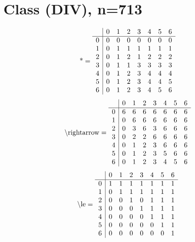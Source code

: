 \documentclass[11pt]{article}
\begin{document}
\section{Class (DIV), n=713}
\[\text{*} = 
\begin{array}{r | r r r r r r r}
 & 0 & 1 & 2 & 3 & 4 & 5 & 6 \\ \hline
0 & 0 & 0 & 0 & 0 & 0 & 0 & 0 \\
1 & 0 & 1 & 1 & 1 & 1 & 1 & 1 \\
2 & 0 & 1 & 2 & 1 & 2 & 2 & 2 \\
3 & 0 & 1 & 1 & 3 & 3 & 3 & 3 \\
4 & 0 & 1 & 2 & 3 & 4 & 4 & 4 \\
5 & 0 & 1 & 2 & 3 & 4 & 4 & 5 \\
6 & 0 & 1 & 2 & 3 & 4 & 5 & 6 \\
\end{array}
\]
\[\text{\textbackslash rightarrow} = 
\begin{array}{r | r r r r r r r}
 & 0 & 1 & 2 & 3 & 4 & 5 & 6 \\ \hline
0 & 6 & 6 & 6 & 6 & 6 & 6 & 6 \\
1 & 0 & 6 & 6 & 6 & 6 & 6 & 6 \\
2 & 0 & 3 & 6 & 3 & 6 & 6 & 6 \\
3 & 0 & 2 & 2 & 6 & 6 & 6 & 6 \\
4 & 0 & 1 & 2 & 3 & 6 & 6 & 6 \\
5 & 0 & 1 & 2 & 3 & 5 & 6 & 6 \\
6 & 0 & 1 & 2 & 3 & 4 & 5 & 6 \\
\end{array}
\]
\[\text{\textbackslash le} = 
\begin{array}{r | r r r r r r r}
 & 0 & 1 & 2 & 3 & 4 & 5 & 6 \\ \hline
0 & 1 & 1 & 1 & 1 & 1 & 1 & 1 \\
1 & 0 & 1 & 1 & 1 & 1 & 1 & 1 \\
2 & 0 & 0 & 1 & 0 & 1 & 1 & 1 \\
3 & 0 & 0 & 0 & 1 & 1 & 1 & 1 \\
4 & 0 & 0 & 0 & 0 & 1 & 1 & 1 \\
5 & 0 & 0 & 0 & 0 & 0 & 1 & 1 \\
6 & 0 & 0 & 0 & 0 & 0 & 0 & 1 \\
\end{array}
\]
\end{document}
